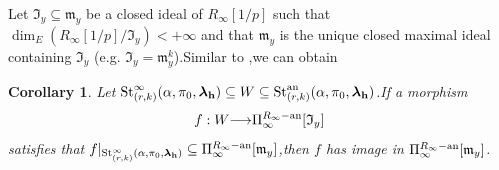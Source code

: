 \documentclass[SecEq,CM,GP]{degruyter-crelle} %
\theoremstyle{plain}
\newtheorem{cor}[thm]{Corollary}
\newcommand{\ana}{{\rm an}}
\newcommand{\lrr}{{\langle r\rangle}}
\newcommand{\omepik}{\Omega_{[1,k]}}
\newcommand{\ra}{{\longrightarrow}}
\newcommand{\st}{{\rm St}}
\newcommand{\bh}{{\mathbf{h}}}
\newcommand{\cM}{\mathcal M}
\newcommand{\FI}{{\mathfrak{I}}}
\newcommand{\fm}{{\mathfrak{m}}}
\newcommand{\fz}{{\mathfrak{z}}}
\begin{document}

Let $\FI_y\subseteq \fm_y$ be a closed ideal of $R_{\infty}[1/p]$ such that $\dim_E (R_{\infty}[1/p]/\FI_y) < +\infty$ and that $\fm_y$ is the unique closed maximal ideal containing $\FI_y$ (e.g. $\FI_y=\fm_y^k$).\;Similar to \cite[Corollary 4.9]{2015Ding},\;we can obtain
\begin{cor}\label{cor: lgln-bij3}
Let $\st_{(r,k)}^{\infty}(\alpha,\pi_0,{\bm\lambda}_\bh)\subseteq W\subseteq \st_{(r,k)}^{\ana}(\alpha,\pi_0, {\bm\lambda}_\bh)$.\;If a morphism $$f: W\ra \Pi_{\infty}^{R_{\infty}-\ana}[\FI_y]$$ satisfies that $f|_{\st_{(r,k)}^{\infty}(\alpha,\pi_0,{\bm\lambda}_\bh)}\subseteq \Pi_{\infty}^{R_{\infty}-\ana}[\fm_y]$,\;then $f$ has image in $\Pi_{\infty}^{R_{\infty}-\ana}[\fm_y]$.
\end{cor}
\end{document}
